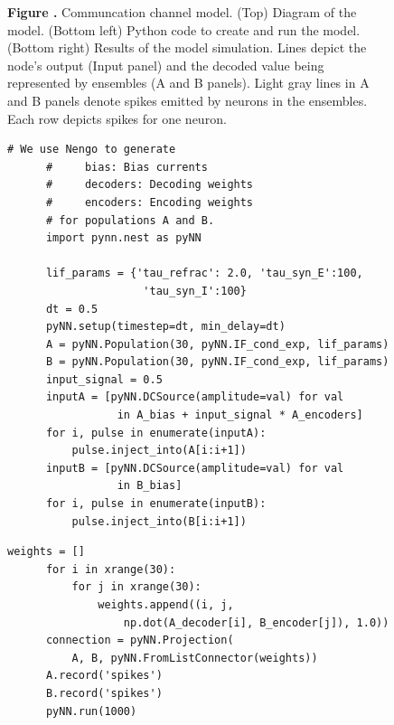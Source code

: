 \documentclass{frontiersSCNS}
\begin{document}
\begin{figure}
\begin{center}
\begin{minipage}{0.37\textwidth}
  \end{minipage}
\end{center}
 \textbf{\label{fig:cchannel} Figure .}{
   Communcation channel model. (Top) Diagram of the model.
   (Bottom left) Python code to create and run the model.
   (Bottom right) Results of the model simulation. Lines depict
   the node's output (Input panel) and the decoded value being represented
   by ensembles (A and B panels). Light gray lines in A and B panels denote
   spikes emitted by neurons in the ensembles. Each row depicts spikes
   for one neuron.}
\end{figure}

\begin{figure}
\begin{center}
  \begin{minipage}{.495\textwidth}
    \begin{lstlisting}[basicstyle={\footnotesize\ttfamily}]
      # We use Nengo to generate
      #     bias: Bias currents
      #     decoders: Decoding weights
      #     encoders: Encoding weights
      # for populations A and B.
      import pynn.nest as pyNN

      lif_params = {'tau_refrac': 2.0, 'tau_syn_E':100,
                     'tau_syn_I':100}
      dt = 0.5
      pyNN.setup(timestep=dt, min_delay=dt)
      A = pyNN.Population(30, pyNN.IF_cond_exp, lif_params)
      B = pyNN.Population(30, pyNN.IF_cond_exp, lif_params)
      input_signal = 0.5
      inputA = [pyNN.DCSource(amplitude=val) for val
                 in A_bias + input_signal * A_encoders]
      for i, pulse in enumerate(inputA):
          pulse.inject_into(A[i:i+1])
      inputB = [pyNN.DCSource(amplitude=val) for val
                 in B_bias]
      for i, pulse in enumerate(inputB):
          pulse.inject_into(B[i:i+1])
    \end{lstlisting}
  \end{minipage}
  \begin{minipage}{.495\textwidth}
    \begin{lstlisting}[basicstyle={\footnotesize\ttfamily}]
      weights = []
      for i in xrange(30):
          for j in xrange(30):
              weights.append((i, j,
                  np.dot(A_decoder[i], B_encoder[j]), 1.0))
      connection = pyNN.Projection(
          A, B, pyNN.FromListConnector(weights))
      A.record('spikes')
      B.record('spikes')
      pyNN.run(1000)


\end{lstlisting}
\end{minipage}
\end{center}
\end{figure}
\end{document}
